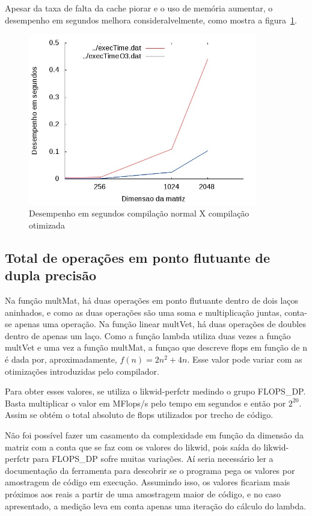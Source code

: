 \documentclass[12pt]{article}
\begin{document}
Apesar da taxa de falta da cache piorar e o uso de memória aumentar, o
desempenho em segundos melhora consideralvelmente, como mostra a
figura~\ref{fig:compExec}.

\begin{figure}[htb] \begin{center}
\includegraphics[width=100mm]{img/compExec.jpg} \end{center}
\caption{Desempenho em segundos compilação normal X compilação otimizada}\label{fig:compExec}
\end{figure}

\clearpage

\subsection{Total de operações em ponto flutuante de dupla precisão}\label{sec:flopOp}

Na função multMat, há duas operações em ponto flutuante dentro de dois laços
aninhados, e como as duas operações são uma soma e multiplicação juntas,
conta-se apenas uma operação. Na função linear multVet, há duas operações de
doubles dentro de apenas um laço. Como a função lambda utiliza duas vezes a
função multVet e uma vez a função multMat, a funçao que descreve flops em função
de n é dada por, aproximadamente, $f(n) = 2n^2 + 4n$. Esse valor pode variar com
as otimizações introduzidas pelo compilador.

Para obter esses valores, se utiliza o likwid-perfctr medindo o grupo FLOPS\_DP.
Basta multiplicar o valor em MFlops/s pelo tempo em segundos e então por
$2^{20}$. Assim se obtém o total absoluto de flops utilizados por trecho de
código.

Não foi possível fazer um casamento da complexidade em função da dimensão da
matriz com a conta que se faz com os valores do likwid, pois saída do
likwid-perfctr para FLOPS\_DP sofre muitas variações. Aí seria necessário ler a
documentação da ferramenta  para descobrir se o programa pega os valores por
amostragem de código em execução. Assumindo isso, os valores ficariam mais
próximos aos reais a partir de uma amostragem maior de código, e no caso
apresentado, a medição leva em conta apenas uma iteração do cálculo do lambda.
\end{document}
